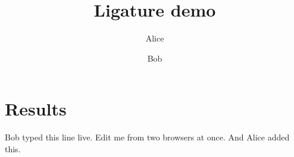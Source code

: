 \documentclass{article}
\title{Ligature demo}
\author{Alice \and Bob}
\begin{document}
\maketitle



\section{Results}Bob typed this line live.
Edit me from two browsers at once. And Alice added this.
\end{document}
